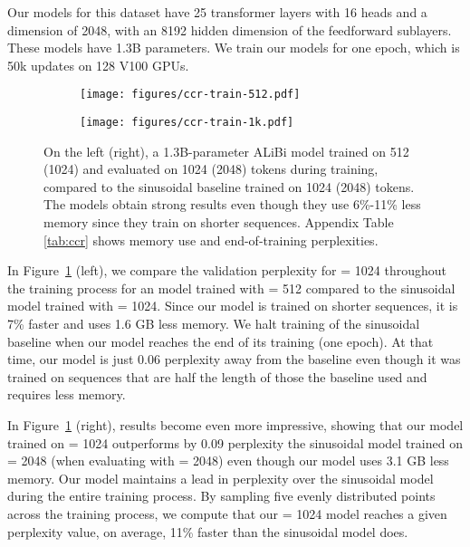  

Our models for this dataset have 25 transformer layers with 16 heads and a dimension of 2048, with an 8192 hidden dimension of the feedforward sublayers.
These models have 1.3B parameters. 
We train our models for one epoch, which is 50k updates on 128 V100 GPUs.

\begin{figure}
\centering
\begin{subfigure}{.45\textwidth} %
  \centering
  \texttt{[image: figures/ccr-train-512.pdf]}
 
\end{subfigure}%
\begin{subfigure}{.45\textwidth} %
  \centering
 \texttt{[image: figures/ccr-train-1k.pdf]}
\end{subfigure}
\caption{ On the left (right), a 1.3B-parameter ALiBi model trained on 512 (1024) and evaluated on 1024 (2048) tokens during training, compared to the sinusoidal baseline trained on 1024 (2048) tokens. The \al models obtain strong results even though they use 6\%-11\% less memory since they train on shorter sequences. Appendix Table \ref{tab:ccr} shows memory use and end-of-training perplexities.}
\label{fig:ccr_train_all}
\end{figure}

In Figure~\ref{fig:ccr_train_all} (left), we compare the validation perplexity for \li = 1024 throughout the training process for an \al model trained with \lt = 512 compared to the sinusoidal model trained with \lt = 1024. Since our model is trained on shorter sequences, it is 7\% faster and uses 1.6 GB less memory. We halt training of the sinusoidal baseline when our model reaches the end of its training (one epoch). 
At that time, our model is just 0.06 perplexity away from the baseline even though it was trained on sequences that are half the length of those the baseline used and requires less memory.

In Figure~\ref{fig:ccr_train_all} (right), results become even more impressive, showing that our model trained on \lt = 1024 outperforms by 0.09 perplexity the sinusoidal model trained on \lt = 2048 (when evaluating with \li = 2048) even though our model uses 3.1 GB less memory. Our model maintains a lead in perplexity over the sinusoidal model during the entire training process. By sampling five evenly distributed points across the training process, we compute that our \lt = 1024 model reaches a given perplexity value, on average, 11\% faster than the sinusoidal model does. 

